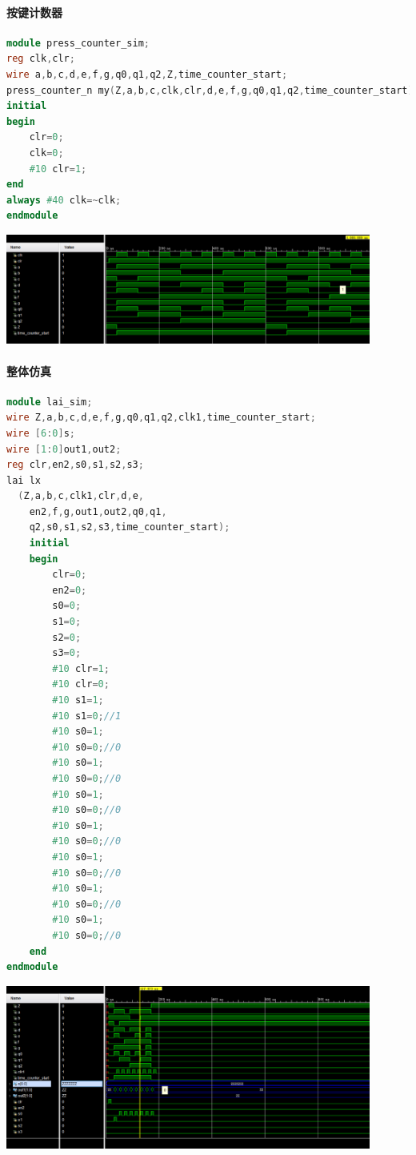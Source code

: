 \documentclass[a4paper,11pt]{ctexart}
\begin{document}
\paragraph{按键计数器}
\begin{lstlisting}[language={verilog}]
module press_counter_sim;
reg clk,clr;
wire a,b,c,d,e,f,g,q0,q1,q2,Z,time_counter_start;
press_counter_n my(Z,a,b,c,clk,clr,d,e,f,g,q0,q1,q2,time_counter_start);
initial
begin
    clr=0;
    clk=0;
    #10 clr=1;
end
always #40 clk=~clk;
endmodule

\end{lstlisting}
\includegraphics[width=0.9\textwidth]{./images/Lsim6.eps}

\paragraph{整体仿真}
\begin{lstlisting}[language={verilog}]
module lai_sim;
wire Z,a,b,c,d,e,f,g,q0,q1,q2,clk1,time_counter_start;
wire [6:0]s;
wire [1:0]out1,out2;
reg clr,en2,s0,s1,s2,s3;
lai lx
  (Z,a,b,c,clk1,clr,d,e,
    en2,f,g,out1,out2,q0,q1,
    q2,s0,s1,s2,s3,time_counter_start);
    initial
    begin
        clr=0;
        en2=0;
        s0=0;
        s1=0;
        s2=0;
        s3=0;
        #10 clr=1;
        #10 clr=0;
        #10 s1=1;
        #10 s1=0;//1
        #10 s0=1;
        #10 s0=0;//0
        #10 s0=1;
        #10 s0=0;//0
        #10 s0=1;
        #10 s0=0;//0
        #10 s0=1;
        #10 s0=0;//0
        #10 s0=1;
        #10 s0=0;//0
        #10 s0=1;
        #10 s0=0;//0
        #10 s0=1;
        #10 s0=0;//0
    end
endmodule

\end{lstlisting}

\includegraphics[width=0.9\textwidth]{./images/Lsim4.eps}
\end{document}

